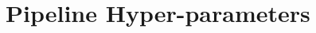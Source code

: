 \chapter{Pipeline Hyper-parameters}
\label{appendix:pipeline_hyperparameters}

\begin{comment}

Pipeline Creation
- CV Folds: 3
- Search Iterations: 30
- Pre-Processing:
    - Imputer Strategy: [Mean, Median, Most Frequent]
    - Transformer Function: [None, Log1P, SQRT]
    - Scaler Function: [None, StandardScaler, RobustScaler, MinMaxScaler]
    - Extractor: [None, PCA [1, 100]]
- Classifiers:
    - GaussianNB (Naive Bayes)
    - KNeighborsClassifier (K-Nearest Neighbours):
        - Neighbors: [5,20]
        - Weights: [Uniform, Distance]
    - LogisticRegression (Logistic Regression)
        - C: [1e-3, 1e6]
        - Penalty: [L1, L2]
        - Classes: Balanced
    - DecisionTreeClassifier (Decision Tree):
        - Max Depth: [5, 20]
        - Classes: Balanced
        - Criterion: [Gini, Entropy]
    - RandomForestClassifier (Random Forest):
        - Estimators: [10,100]
        - Max Depth: [5,20]
        - Criterion: [Gini, Entropy]
        - Classes: Balanced
    - SVC (Support Vector Machine):
        - Kernel: [Linear, Poly, RBF]
        - C: [1e-5, 1e6]
        - Probability: True
        - Classes: Balanced
    - MLPClassifier (Artificial Neural Networks):
        - Activation: [Identity, Logistic, Tanh, Relu]
        - Alpha: [1e-3, 1e6]

Pipeline Selection:
- Finalist Pipelines: 10
- Finalist Criterion: Area under the Precision-Recall Curve
- Best Criterion: Area under the Precision-Recall Curve
- Training Set Dates (Feature --> Outcome):
    - (2012, 11, 04) --> (2014, 11, 04)
    - (2013, 01, 19) --> (2015, 01, 17)
    - (2013, 04, 15) --> (2015, 04, 15)
    - (2013, 06, 07) --> (2015, 06, 06)
    - (2014, 01, 22) --> (2016, 01, 21)
    - (2014, 03, 08) --> (2016, 03, 06)
    - (2014, 07, 20) --> (2016, 07, 18)
- CV Folds: 3

Model Evaluation:
- Training Set Dates (Feature --> Outcome):
    - (2012, 09, 09) --> (2016, 09, 09)
    - (2013, 09, 09) --> (2016, 09, 09)
    - (2014, 09, 09) --> (2016, 09, 09)
- Testing Set Dates (Feature --> Outcome):
    - (2013, 04, 04) --> (2017, 04, 04)
    - (2014, 04, 04) --> (2017, 04, 04)
    - (2015, 04, 04) --> (2017, 04, 04)
- Criterion: F1 Score (positive class only)
- Extractor: [None, PCA]
- Feature Stages: [None, [Pre-Seed, Seed, Series A, Series B, Series C, Series D+]]
- Label Types: [Extra Stage, Extra Round, Exit, Acquisition, IPO]

\end{comment}
